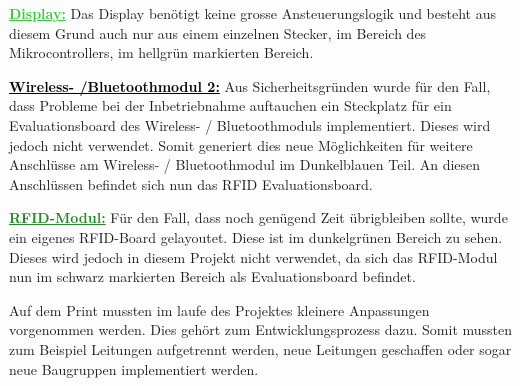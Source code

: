 \textcolor{LimeGreen}{\textbf{\underline{Display:}}}
Das Display benötigt keine grosse Ansteuerungslogik und besteht aus diesem Grund auch nur aus einem einzelnen Stecker, im Bereich des Mikrocontrollers, im hellgrün markierten Bereich.

\textcolor{black}{\textbf{\underline{Wireless- /Bluetoothmodul 2:}}}
Aus Sicherheitsgründen wurde für den Fall, dass Probleme bei der Inbetriebnahme auftauchen ein Steckplatz für ein Evaluationsboard des Wireless- / Bluetoothmoduls implementiert. Dieses wird jedoch nicht verwendet. Somit generiert dies neue Möglichkeiten für weitere Anschlüsse am Wireless- / Bluetoothmodul im Dunkelblauen Teil. An diesen Anschlüssen befindet sich nun das RFID Evaluationsboard. 

\textcolor{ForestGreen}{\textbf{\underline{RFID-Modul:}}}
Für den Fall, dass noch genügend Zeit übrigbleiben sollte, wurde ein eigenes RFID-Board gelayoutet. Diese ist im dunkelgrünen Bereich zu sehen. Dieses wird jedoch in diesem Projekt nicht verwendet, da sich das RFID-Modul nun im schwarz markierten Bereich als Evaluationsboard befindet. 

Auf dem Print mussten im laufe des Projektes kleinere Anpassungen vorgenommen werden. Dies gehört zum Entwicklungsprozess dazu. Somit mussten zum Beispiel Leitungen aufgetrennt werden, neue Leitungen geschaffen oder sogar neue Baugruppen implementiert werden.
